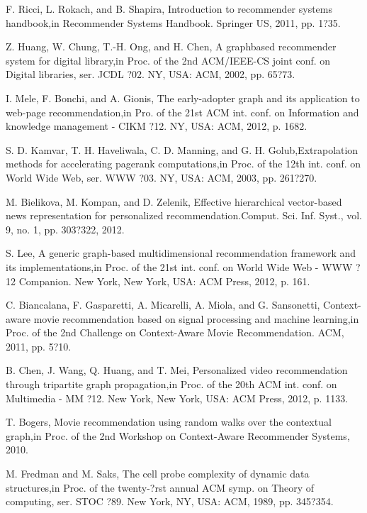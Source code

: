 \documentclass[10pt,slovak,a4paper]{article}
\begin{document}
\begin{multicols}{2}
\begin{thebibliography}{99}
 F. Ricci, L. Rokach, and B. Shapira, \glqq Introduction to recommender systems handbook,\glqq in Recommender Systems Handbook. Springer US, 2011, pp. 1?35.

 Z. Huang, W. Chung, T.-H. Ong, and H. Chen, \glqq A graphbased recommender system for digital library,\glqq in Proc. of the 2nd ACM/IEEE-CS joint conf. on Digital libraries, ser. JCDL ?02. NY, USA: ACM, 2002, pp. 65?73.

 I. Mele, F. Bonchi, and A. Gionis, \glqq The early-adopter graph and its application to web-page recommendation,\glqq in Pro. of the 21st ACM int. conf. on Information and knowledge management - CIKM ?12. NY, USA: ACM, 2012, p. 1682.

 S. D. Kamvar, T. H. Haveliwala, C. D. Manning, and G. H. Golub,\glqq Extrapolation methods for accelerating pagerank computations,\glqq in Proc. of the 12th int. conf. on World Wide Web, ser. WWW ?03. NY, USA: ACM, 2003, pp. 261?270.

 M. Bielikova, M. Kompan, and D. Zelenik, \glqq Effective hierarchical vector-based news representation for personalized recommendation.\glqq Comput. Sci. Inf. Syst., vol. 9, no. 1, pp. 303?322, 2012.

 S. Lee, \glqq A generic graph-based multidimensional recommendation framework and its implementations,\glqq in Proc. of the 21st int. conf. on World Wide Web - WWW ?12 Companion. New York, New York, USA: ACM Press, 2012, p. 161.

 C. Biancalana, F. Gasparetti, A. Micarelli, A. Miola, and G. Sansonetti, \glqq Context-aware movie recommendation based on signal processing and machine learning,\glqq in Proc. of the 2nd Challenge on Context-Aware Movie Recommendation. ACM, 2011, pp. 5?10.

 B. Chen, J. Wang, Q. Huang, and T. Mei, \glqq Personalized video recommendation through tripartite graph propagation,\glqq in Proc. of the 20th ACM int. conf. on Multimedia - MM ?12. New York, New York, USA: ACM Press, 2012, p. 1133.

 T. Bogers, \glqq Movie recommendation using random walks over the contextual graph,\glqq in Proc. of the 2nd Workshop on Context-Aware Recommender Systems, 2010.

 M. Fredman and M. Saks, \glqq The cell probe complexity of dynamic data structures,\glqq in Proc. of the twenty-?rst annual ACM symp. on Theory of computing, ser. STOC ?89. New York, NY, USA: ACM, 1989, pp. 345?354.

\end{thebibliography}

\end{multicols}
\end{document}
